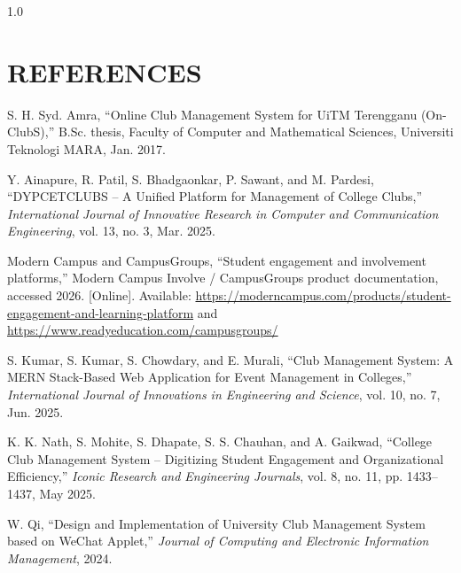 \documentclass[12pt,oneside]{book}
\begin{document}
\begin{spacing}{1.0}
\chapter*{REFERENCES}

\begin{enumerate}[label={[\arabic*]}, leftmargin=2.2em, itemsep=6pt]

\item\label{ref1} S. H. Syd. Amra, ``Online Club Management System for UiTM Terengganu (On-ClubS),'' B.Sc. thesis, Faculty of Computer and Mathematical Sciences, Universiti Teknologi MARA, Jan. 2017.

\item\label{ref2} Y. Ainapure, R. Patil, S. Bhadgaonkar, P. Sawant, and M. Pardesi, ``DYPCETCLUBS -- A Unified Platform for Management of College Clubs,'' \textit{International Journal of Innovative Research in Computer and Communication Engineering}, vol. 13, no. 3, Mar. 2025.

\item\label{ref3} Modern Campus and CampusGroups, ``Student engagement and involvement platforms,'' Modern Campus Involve / CampusGroups product documentation, accessed 2026. [Online]. Available: \url{https://moderncampus.com/products/student-engagement-and-learning-platform} and \url{https://www.readyeducation.com/campusgroups/}

\item\label{ref4} S. Kumar, S. Kumar, S. Chowdary, and E. Murali, ``Club Management System: A MERN Stack-Based Web Application for Event Management in Colleges,'' \textit{International Journal of Innovations in Engineering and Science}, vol. 10, no. 7, Jun. 2025.

\item\label{ref5} K. K. Nath, S. Mohite, S. Dhapate, S. S. Chauhan, and A. Gaikwad, ``College Club Management System -- Digitizing Student Engagement and Organizational Efficiency,'' \textit{Iconic Research and Engineering Journals}, vol. 8, no. 11, pp. 1433--1437, May 2025.

\item\label{ref6} W. Qi, ``Design and Implementation of University Club Management System based on WeChat Applet,'' \textit{Journal of Computing and Electronic Information Management}, 2024.


\end{enumerate}
\end{spacing}
\end{document}
